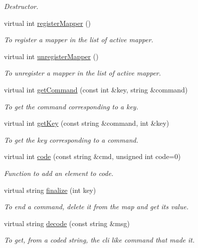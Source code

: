 \begin{DoxyCompactItemize}
\begin{DoxyCompactList}\small\item\em Destructor. \item\end{DoxyCompactList}\item 
virtual int \hyperlink{classUMSMapper_a39acbc8e93c31d005a3a676ce9ec5e4c}{registerMapper} ()
\begin{DoxyCompactList}\small\item\em To register a mapper in the list of active mapper. \item\end{DoxyCompactList}\item 
virtual int \hyperlink{classUMSMapper_ae825ecd7039b09d7ddd74be5e2236628}{unregisterMapper} ()
\begin{DoxyCompactList}\small\item\em To unregister a mapper in the list of active mapper. \item\end{DoxyCompactList}\item 
virtual int \hyperlink{classUMSMapper_abf93114fd8a822d7d1b342686e2d32f9}{getCommand} (const int \&key, string \&command)
\begin{DoxyCompactList}\small\item\em To get the command corresponding to a key. \item\end{DoxyCompactList}\item 
virtual int \hyperlink{classUMSMapper_a1a8e2189e1770c426387e391dc75dce9}{getKey} (const string \&command, int \&key)
\begin{DoxyCompactList}\small\item\em To get the key corresponding to a command. \item\end{DoxyCompactList}\item 
virtual int \hyperlink{classUMSMapper_af5aec06e19b9b242645cf1abc2d6dad0}{code} (const string \&cmd, unsigned int code=0)
\begin{DoxyCompactList}\small\item\em Function to add an element to code. \item\end{DoxyCompactList}\item 
virtual string \hyperlink{classUMSMapper_a831047c74368517e2164acc872ecb288}{finalize} (int key)
\begin{DoxyCompactList}\small\item\em To end a command, delete it from the map and get its value. \item\end{DoxyCompactList}\item 
virtual string \hyperlink{classUMSMapper_a09302a31b4cc2698d0e0d563988fb7c3}{decode} (const string \&msg)
\begin{DoxyCompactList}\small\item\em To get, from a coded string, the cli like command that made it. \item\end{DoxyCompactList}\end{DoxyCompactItemize}
